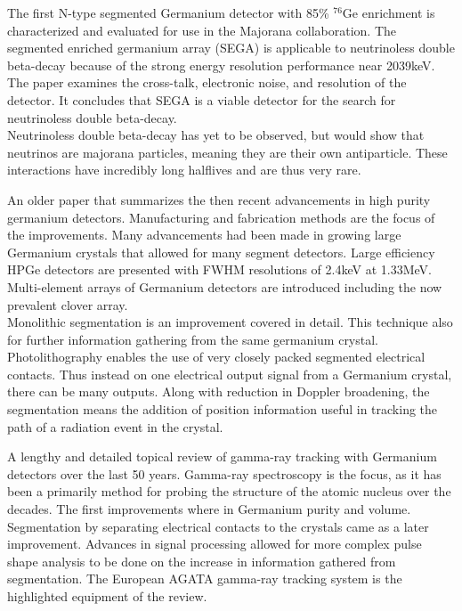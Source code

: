 \documentclass[12pt]{article}
\begin{document}
\begin{doublespacing}
\citep{Leviner201466}
The first N-type segmented Germanium detector with 85\% $^{76}\mbox{Ge}$ enrichment is characterized and evaluated for use in the Majorana collaboration.
The segmented enriched germanium array (SEGA) is applicable to neutrinoless double beta-decay because of the strong energy resolution performance near 2039keV.
The paper examines the cross-talk, electronic noise, and resolution of the detector.
It concludes that SEGA is a viable detector for the search for neutrinoless double beta-decay.
\\
Neutrinoless double beta-decay has yet to be observed, but would show that neutrinos are majorana particles, meaning they are their own antiparticle.
These interactions have incredibly long halflives and are thus very rare.


\citep{Sangsingkeow2003183}
An older paper that summarizes the then recent advancements in high purity germanium detectors.
Manufacturing and fabrication methods are the focus of the improvements.
Many advancements had been made in growing large Germanium crystals that allowed for many segment detectors.
Large efficiency HPGe detectors are presented with FWHM resolutions of 2.4keV at 1.33MeV.
Multi-element arrays of Germanium detectors are introduced including the now prevalent clover array.
\\

Monolithic segmentation is an improvement covered in detail.
This technique also for further information gathering from the same germanium crystal.
Photolithography enables the use of very closely packed segmented electrical contacts.
Thus instead on one electrical output signal from a Germanium crystal, there can be many outputs.
Along with reduction in Doppler broadening, the segmentation means the addition of position information useful in tracking the path of a radiation event in the crystal.


\citep{Eberth2008283}
A lengthy and detailed topical review of gamma-ray tracking with Germanium detectors over the last 50 years.
Gamma-ray spectroscopy is the focus, as it has been a primarily method for probing the structure of the atomic nucleus over the decades.
The first improvements where in Germanium purity and volume.
Segmentation by separating electrical contacts to the crystals came as a later improvement.
Advances in signal processing allowed for more complex pulse shape analysis to be done on the increase in information gathered from segmentation.
The European AGATA gamma-ray tracking system is the highlighted equipment of the review.
\\


\end{doublespacing}
\end{document}
